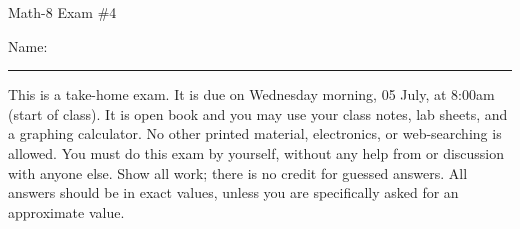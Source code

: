 \documentclass[letterpaper,12pt,fleqn]{article}
\begin{document}
\begin{center}
\Large Math-8 Exam \#4
\end{center}

\vspace{0.5in}

Name: \rule{4in}{1pt}

\vspace{0.5in}

This is a take-home exam. It is due on Wednesday morning, 05 July, at 8:00am
(start of class). It is open book and you may use your class notes, lab sheets,
and a graphing calculator. No other printed material, electronics, or
web-searching is allowed. You must do this exam by yourself, without any help
from or discussion with anyone else. Show all work; there is no credit for
guessed answers. All answers should be in exact values, unless you are
specifically asked for an approximate value.

\vspace{0.5in}
\end{document}
